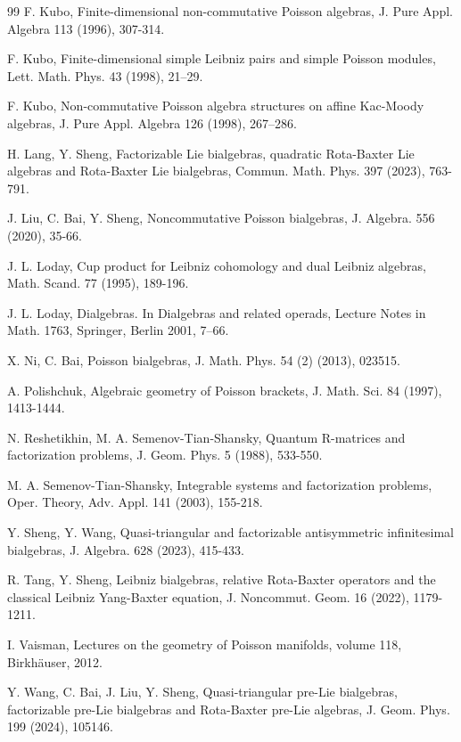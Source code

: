 \documentclass[12pt]{amsart}
\theoremstyle{definition}
\begin{document}
\begin{thebibliography} {99}
  F. Kubo, Finite-dimensional non-commutative Poisson algebras, J. Pure Appl. Algebra 113 (1996), 307-314.
 
  F. Kubo, Finite-dimensional simple Leibniz pairs and simple Poisson modules, Lett. Math. Phys.
43 (1998), 21–29.

  F. Kubo, Non-commutative Poisson algebra structures on affine Kac-Moody algebras, J. Pure Appl.
Algebra 126 (1998), 267–286.

 H. Lang, Y. Sheng, Factorizable Lie bialgebras, quadratic Rota-Baxter Lie algebras and Rota-Baxter
Lie bialgebras, Commun. Math. Phys. 397 (2023), 763-791.
    
  J. Liu, C. Bai, Y. Sheng, Noncommutative Poisson bialgebras, J. Algebra. 556 (2020), 35-66.
 
  J. L. Loday, Cup product for Leibniz cohomology and dual Leibniz algebras, Math. Scand. 77 (1995), 189-196.
 
   J. L. Loday, Dialgebras. In Dialgebras and related operads, Lecture Notes in Math.
1763, Springer, Berlin 2001, 7–66.

 X. Ni, C. Bai, Poisson bialgebras, J. Math. Phys. 54 (2) (2013), 023515.

   A. Polishchuk, Algebraic geometry of Poisson brackets, J. Math. Sci. 84 (1997), 1413-1444.
  
 N. Reshetikhin, M. A. Semenov-Tian-Shansky, Quantum R-matrices and factorization problems, J. Geom. Phys. 5
(1988), 533-550.

 M. A. Semenov-Tian-Shansky, Integrable systems and factorization problems, Oper. Theory, Adv. Appl. 141 (2003),
155-218.

 Y. Sheng, Y. Wang, Quasi-triangular and factorizable antisymmetric
infinitesimal bialgebras, J. Algebra. 628 (2023), 415-433.

  R. Tang, Y. Sheng, Leibniz bialgebras, relative Rota-Baxter operators and the classical Leibniz Yang-Baxter
equation, J. Noncommut. Geom. 16 (2022), 1179-1211.

  I. Vaisman, Lectures on the geometry of Poisson manifolds, volume 118, Birkhäuser, 2012. 
 
  Y. Wang, C. Bai, J. Liu, Y. Sheng, Quasi-triangular pre-Lie bialgebras, factorizable pre-Lie
bialgebras and Rota-Baxter pre-Lie algebras, J. Geom. Phys. 199 (2024), 105146.


\end{thebibliography}
\end{document}
